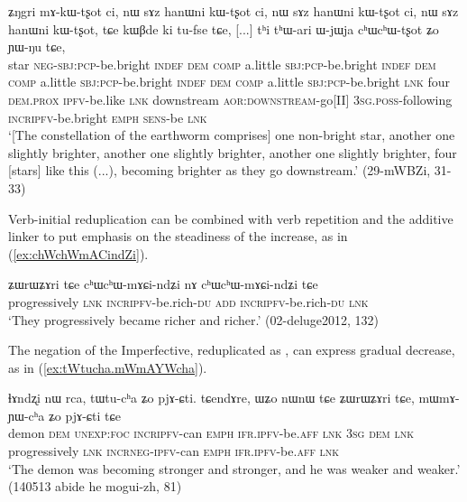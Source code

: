 \begin{exe}
\ex \label{ex:chWchWtsxot}
\gll ʑŋgri mɤ-kɯ-tʂot ci, nɯ sɤz hanɯni kɯ-tʂot ci, nɯ sɤz hanɯni kɯ-tʂot ci, nɯ sɤz hanɯni kɯ-tʂot,
tɕe kɯβde ki tu-fse tɕe, [...] tʰi tʰɯ-ari ɯ-jɯja cʰɯ\redp{}cʰɯ-tʂot ʑo ɲɯ-ŋu tɕe, \\
star \textsc{neg}-\textsc{sbj}:\textsc{pcp}-be.bright \textsc{indef} \textsc{dem} \textsc{comp} a.little \textsc{sbj}:\textsc{pcp}-be.bright \textsc{indef} \textsc{dem} \textsc{comp} a.little \textsc{sbj}:\textsc{pcp}-be.bright \textsc{indef} \textsc{dem} \textsc{comp} a.little \textsc{sbj}:\textsc{pcp}-be.bright  \textsc{lnk} four \textsc{dem}.\textsc{prox} \textsc{ipfv}-be.like \textsc{lnk} { } downstream \textsc{aor}:\textsc{downstream}-go[II] \textsc{3sg}.\textsc{poss}-following \textsc{incr}\redp{}\textsc{ipfv}-be.bright \textsc{emph} \textsc{sens}-be \textsc{lnk} \\
\glt `[The constellation of the earthworm comprises] one non-bright star, another one slightly brighter, another one slightly brighter, another one slightly brighter, four [stars] like this (...), becoming brighter as they go downstream.' (29-mWBZi, 31-33)
\end{exe}

Verb-initial reduplication can be combined with verb repetition and the additive linker   to put emphasis on the steadiness of the increase, as in (\ref{ex:chWchWmACindZi}).

\begin{exe}
\ex \label{ex:chWchWmACindZi}
\gll   ʑɯrɯʑɤri tɕe cʰɯ\redp{}cʰɯ-mɤɕi-ndʑi nɤ cʰɯ\redp{}cʰɯ-mɤɕi-ndʑi tɕe \\
progressively \textsc{lnk} \textsc{incr}\redp{}\textsc{ipfv}-be.rich-\textsc{du} \textsc{add} \textsc{incr}\redp{}\textsc{ipfv}-be.rich-\textsc{du} \textsc{lnk} \\
\glt `They progressively became richer and richer.' (02-deluge2012, 132)
\end{exe}

The negation  of the Imperfective, reduplicated as , can express gradual decrease, as in (\ref{ex:tWtucha.mWmAYWcha}).

\begin{exe}
\ex \label{ex:tWtucha.mWmAYWcha}
\gll ɬɤndʐi nɯ rca, tɯ\redp{}tu-cʰa ʑo pjɤ-ɕti. tɕendɤre, ɯʑo nɯnɯ tɕe ʑɯrɯʑɤri tɕe, mɯ\redp{}mɤ-ɲɯ-cʰa ʑo pjɤ-ɕti tɕe \\
demon \textsc{dem} \textsc{unexp}:\textsc{foc} \textsc{incr}\redp{}\textsc{ipfv}-can \textsc{emph} \textsc{ifr}.\textsc{ipfv}-be.\textsc{aff} \textsc{lnk} \textsc{3sg} \textsc{dem} \textsc{lnk} progressively \textsc{lnk} \textsc{incr}\redp{}\textsc{neg}-\textsc{ipfv}-can \textsc{emph} \textsc{ifr}.\textsc{ipfv}-be.\textsc{aff} \textsc{lnk} \\
\glt `The demon was becoming stronger and stronger, and he was weaker and weaker.' (140513 abide he mogui-zh, 81)
\end{exe}

